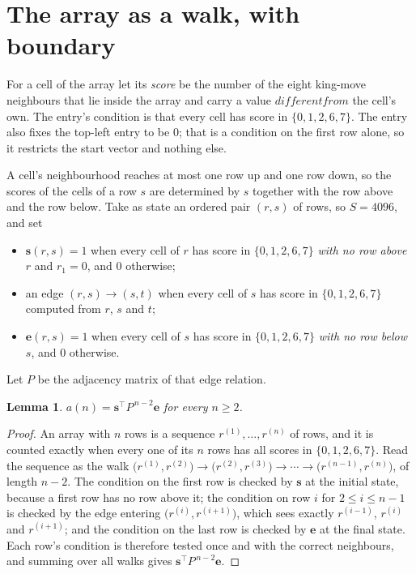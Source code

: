 \documentclass[11pt,a4paper]{article}
\theoremstyle{plain}
\newtheorem{lemma}[theorem]{Lemma}
\theoremstyle{definition}
\begin{document}
\section{The array as a walk, with boundary}

For a cell of the array let its \emph{score} be the number of the eight king-move neighbours that lie inside
the array and carry a value $different from$ the cell's own. The entry's condition is that every cell
has score in $\{0,1,2,6,7\}$. The entry also fixes the top-left entry to be $0$; that is a condition on the first row alone, so it restricts the start vector and nothing else.

A cell's neighbourhood reaches at most one row up and one row down, so the scores of the
cells of a row $s$ are determined by $s$ together with the row above and the row below.
Take as state an ordered pair $(r,s)$ of rows, so $S=4096$, and set
\begin{itemize}
\item $\mathbf{s}(r,s)=1$ when every cell of $r$ has score in $\{0,1,2,6,7\}$ \emph{with no row
above $r$} and $r_1=0$, and $0$ otherwise;
\item an edge $(r,s)\to(s,t)$ when every cell of $s$ has score in $\{0,1,2,6,7\}$ computed from
$r$, $s$ and $t$;
\item $\mathbf{e}(r,s)=1$ when every cell of $s$ has score in $\{0,1,2,6,7\}$ \emph{with no row
below $s$}, and $0$ otherwise.
\end{itemize}
Let $P$ be the adjacency matrix of that edge relation.

\begin{lemma}\label{lem:walk}
$a(n)=\mathbf{s}^{\!\top}P^{\,n-2}\mathbf{e}$ for every $n\ge2$.
\end{lemma}

\begin{proof}
An array with $n$ rows is a sequence $r^{(1)},\dots,r^{(n)}$ of rows, and it is counted
exactly when every one of its $n$ rows has all scores in $\{0,1,2,6,7\}$. Read the sequence as the
walk $\bigl(r^{(1)},r^{(2)}\bigr)\to\bigl(r^{(2)},r^{(3)}\bigr)\to\cdots\to
\bigl(r^{(n-1)},r^{(n)}\bigr)$, of length $n-2$. The condition on the first row is
checked by $\mathbf{s}$ at the initial state, because a first row has no row above it; the
condition on row $i$ for $2\le i\le n-1$ is checked by the edge entering
$\bigl(r^{(i)},r^{(i+1)}\bigr)$, which sees exactly $r^{(i-1)}$, $r^{(i)}$ and
$r^{(i+1)}$; and the condition on the last row is checked by $\mathbf{e}$ at the final
state. Each row's condition is therefore tested once and with the correct neighbours, and
summing over all walks gives $\mathbf{s}^{\!\top}P^{\,n-2}\mathbf{e}$.
\end{proof}
\end{document}
